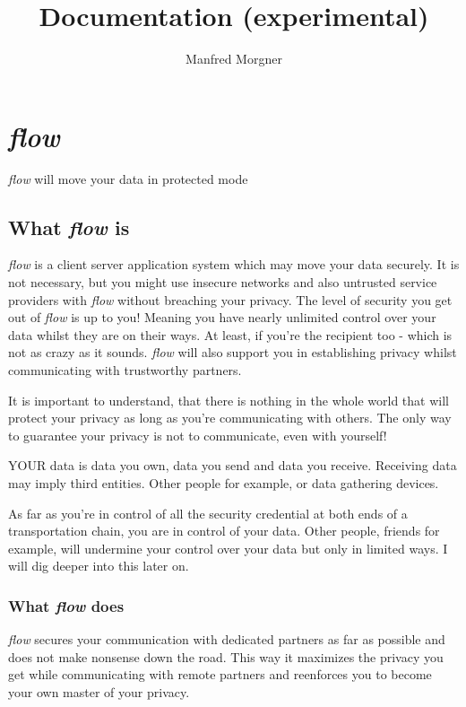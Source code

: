 \documentclass[twoside,a4paper,english,12pt,authoryear,openright]{book}
\title{\flow Documentation (experimental)}
\author{Manfred Morgner}
\newcommand{\flow}{\textit{flow} }
\begin{document}
\maketitle
\frontmatter %
\tableofcontents



\mainmatter



\chapter{\flow}

\flow will move your data in protected mode

\section{What \flow is}

\flow is a client server application system which may move your data securely. It is not necessary, but you might use insecure networks and also untrusted service providers with \flow without breaching your privacy. The level of security you get out of \flow is up to you! Meaning you have nearly unlimited control over your data whilst they are on their ways. At least, if you're the recipient too - which is not as crazy as it sounds. \flow will also support you in establishing privacy whilst communicating with trustworthy partners.

It is important to understand, that there is nothing in the whole world that will protect your privacy as long as you're communicating with others. The only way to guarantee your privacy is not to communicate, even with yourself!

YOUR data is data you own, data you send and data you receive. Receiving data may imply third entities. Other people for example, or data gathering devices.

As far as you're in control of all the security credential at both ends of a transportation chain, you are in control of your data. Other people, friends for example, will undermine your control over your data but only in limited ways. I will dig deeper into this later on.

\subsection{What \flow does}

\flow secures your communication with dedicated partners as far as possible and does not make nonsense down the road. This way it maximizes the privacy you get while communicating with remote partners and reenforces you to become your own master of your privacy.
\end{document}
